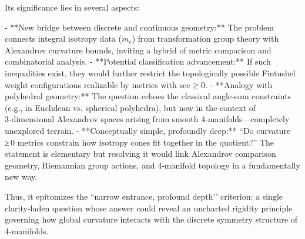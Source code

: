 Its significance lies in several aspects:

- **New bridge between discrete and continuous geometry:**  The problem connects integral isotropy data (\(m_e\)) from transformation group theory with Alexandrov curvature bounds, inviting a hybrid of metric comparison and combinatorial analysis.
- **Potential classification advancement:**  If such inequalities exist, they would further restrict the topologically possible Fintushel weight configurations realizable by metrics with \(\mathrm{sec}\ge0\).
- **Analogy with polyhedral geometry:**  The question echoes the classical angle‑sum constraints (e.g., in Euclidean vs. spherical polyhedra), but now in the context of 3‑dimensional Alexandrov spaces arising from smooth 4‑manifolds—completely unexplored terrain.
- **Conceptually simple, profoundly deep:**  “Do curvature ≥ 0 metrics constrain how isotropy cones fit together in the quotient?”  The statement is elementary but resolving it would link Alexandrov comparison geometry, Riemannian group actions, and 4‑manifold topology in a fundamentally new way.

Thus, it epitomizes the “narrow entrance, profound depth’’ criterion: a single clarity‑laden question whose answer could reveal an uncharted rigidity principle governing how global curvature interacts with the discrete symmetry structure of 4‑manifolds.